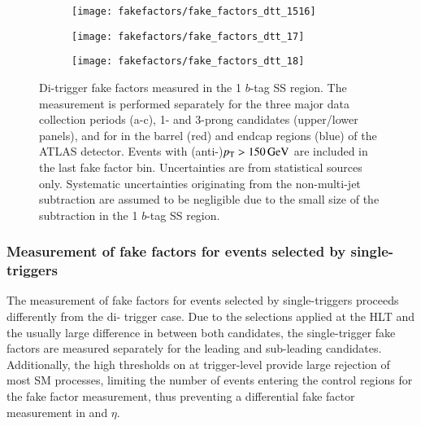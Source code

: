 \begin{figure}[htbp]
  \centering

  \begin{subfigure}{0.495\textwidth}
    \texttt{[image: fakefactors/fake\_factors\_dtt\_1516]}
  \end{subfigure}
  \begin{subfigure}{0.495\textwidth}
    \texttt{[image: fakefactors/fake\_factors\_dtt\_17]}
  \end{subfigure}

  \begin{subfigure}{0.495\textwidth}
    \texttt{[image: fakefactors/fake\_factors\_dtt\_18]}
  \end{subfigure}

  \caption{Di-\tauhadvis trigger fake factors measured in the 1
    $b$-tag SS region. The measurement is performed separately for the
    three major data collection periods (a-c), 1- and 3-prong
    \tauhadvis candidates (upper/lower panels), and for \tauhadvis in
    the barrel (red) and endcap regions (blue) of the ATLAS
    detector. Events with (anti-)\tauhadvis $p_{\text{T}} > \SI{150}{\ensuremath{\text{GeV}}}$ are
    included in the last fake factor bin. Uncertainties are from
    statistical sources only. Systematic uncertainties originating
    from the non-multi-jet subtraction are assumed to be negligible
    due to the small size of the subtraction in the 1 $b$-tag SS
    region.}%
  \label{fig:mjfakes_fake_factors}
\end{figure}


\subsubsection{Measurement of fake factors for events selected by
  single-\tauhadvis triggers}

The measurement of fake factors for events selected by
single-\tauhadvis triggers proceeds differently from the di-\tauhadvis
trigger case. Due to the selections applied at the HLT and the usually
large difference in \pT between both \tauhadvis candidates, the
single-\tauhadvis trigger fake factors are measured separately for the
leading and sub-leading \tauhadvis candidates. Additionally, the high
\pT thresholds on \tauhadvis at trigger-level provide large rejection
of most SM processes, limiting the number of events entering the
control regions for the fake factor measurement, thus preventing a
differential fake factor measurement in \tauhadvis \pT and $\eta$.

